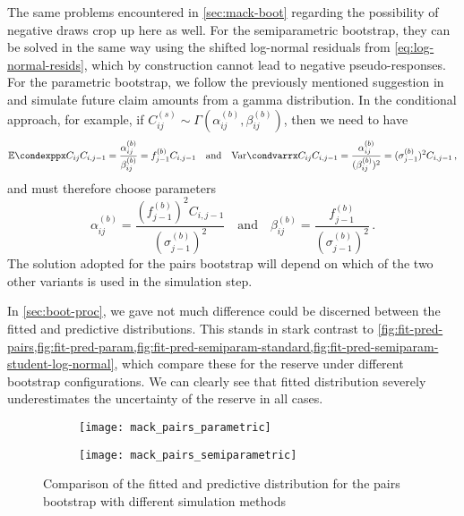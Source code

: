 \documentclass[a4paper]{book}
\begin{document}
The same problems encountered in \cref{sec:mack-boot} regarding the possibility of negative draws crop up here as well. For the semiparametric bootstrap, they can be solved in the same way using the shifted log-normal residuals from \cref{eq:log-normal-resids}, which by construction cannot lead to negative pseudo-responses.  For the parametric bootstrap, we follow the previously mentioned suggestion in \cite{england:dist} and simulate future claim amounts from a gamma distribution. In the conditional approach, for example, if $C^{(s)}_{ij} \sim \Gamma(\alpha^{(b)}_{ij}, \beta^{(b)}_{ij})$, then we need to have
\begin{equation}
  \condexpp{C_{ij}}{C_{i, j - 1}} = \frac{\alpha^{(b)}_{ij}}{\beta^{(b)}_{ij}} = f^{(b)}_{j-1} C_{i, j-1} \quad \text{and} \quad \condvarr{C_{ij}}{C_{i, j - 1}} = \frac{\alpha^{(b)}_{ij}}{(\beta^{(b)}_{ij})^2} = (\sigma^{(b)}_{j-1})^2 C_{i, j-1} \,,
\end{equation}
and must therefore choose parameters
\begin{equation} \label{eq:gamma-sim}
  \alpha^{(b)}_{ij} = \frac{(f^{(b)}_{j-1})^2 C_{i, j-1}}{(\sigma^{(b)}_{j-1})^2} \quad \text{and} \quad \beta^{(b)}_{ij} = \frac{f^{(b)}_{j-1}}{(\sigma^{(b)}_{j-1})^2} \,.
\end{equation}
The solution adopted for the pairs bootstrap will depend on which of the two other variants is used in the simulation step.

In \cref{sec:boot-proc}, we gave not much difference could be discerned between the fitted and predictive distributions. This stands in stark contrast to \cref{fig:fit-pred-pairs,fig:fit-pred-param,fig:fit-pred-semiparam-standard,fig:fit-pred-semiparam-student-log-normal}, which compare these for the reserve under different bootstrap configurations. We can clearly see that fitted distribution severely underestimates the uncertainty of the reserve in all cases.

\begin{figure}[!p]
  \begin{subfigure}{0.45 \textwidth}
    \texttt{[image: mack\_pairs\_parametric]}
  \end{subfigure}
  \begin{subfigure}{0.45 \textwidth}
    \texttt{[image: mack\_pairs\_semiparametric]}
  \end{subfigure}
  \caption{Comparison of the fitted and predictive distribution for the pairs bootstrap with different simulation methods}
  \label{fig:fit-pred-pairs}
\end{figure}
\end{document}
